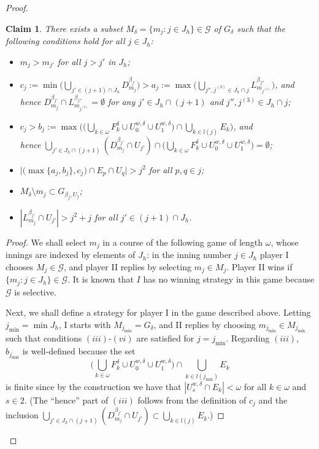 \documentclass[12pt,a4paper]{amsart}
\newtheorem{claim}[theorem]{Claim}
\theoremstyle{definition}
\newcommand{\w}{\omega}
\newcommand{\CG}{\mathcal{G}}
\begin{document}
\begin{proof}
\begin{claim} \label{cl01}
There exists a subset   $M_\delta =\{m_j: j\in J_h\}\in\CG$ of $G_\delta$ such that the following conditions hold for all $j\in J_h$:
\begin{itemize}
\item[$(i)$] $m_{j}>m_{j'}$ for all $j>j'$ in $J_h$;
\item[$(ii)$] 
$c_j:=\min\big(\bigcup_{j'\in(j+1)\cap J_h} D^{\beta_{j'}}_{m_j}  \big)> a_j:=
\max\big(\bigcup_{j'',j^{(3)}\in J_h\cap j} L^{\beta_{j''}}_{m_{j^{(3)}}}   \big)$,  and  \\ hence 
$D^{\beta_{j'}}_{m_j}\cap L^{\beta_{j''}}_{m_{j^{(3)}}}=\emptyset$
for any $j'\in J_h\cap (j+1)$ and $j'',j^{(3)}\in J_h\cap j$;
\item[$(iii)$] $c_j>b_j:=\max\Big(\big (\bigcup_{k\in \w}F^\delta_k\cup U^{w,\delta}_0\cup U^{w,\delta}_1\big)\cap\bigcup_{k\in l(j)}E_k\Big)$,
and \\ hence
$\bigcup_{j'\in J_h\cap (j+1)} (D^{\beta_{j'}}_{m_j}\cap U_{j'})\cap 
\big (\bigcup_{k\in \w}F^\delta_k\cup U^{w,\delta}_0\cup U^{w,\delta}_1\big)=\emptyset$;
\item[$(iv)$] 
$\Big|\big(\max\{a_j,b_j\},c_j\big)\cap E_{p}\cap U_{q}\Big|> j^2$ for all $p,q\in j$;
\item[$(v)$] $M_\delta\setminus m_j\subset G_{\beta_j,U_j} $;
\item[$(vi)$]  $|L^{\beta_{j'}}_{m_j}\cap U_{j'}|>j^2+j$
for all $j'\in (j+1)\cap J_h$.
\end{itemize}
\end{claim}
\begin{proof}
We shall select $m_j$ in a course of the following game of length $\w$,
whose innings are indexed by elements of $J_h$:
in the inning number $j\in J_h$ player I chooses $M_j\in \CG$, and player II replies by
selecting $m_j\in M_j$. Player II wins if $\{m_j:j\in J_h\}\in\CG$. It is known \cite[Theorem~2.6]{Laf96} that $I$ has no winning strategy in this game because 
$\CG$ is selective. 

Next, we shall define a strategy  for player I in the game described above.
Letting $j_{\min}=\min J_h$,
 I starts with 
$M_{j_{\min}}=G_\delta$, and II replies by choosing $m_{j_{\min}}\in M_{j_{\min}}$
such that conditions $(iii)$-$(vi)$ are satisfied for $j=j_{\min}$.
Regarding $(iii)$, $b_{j_{\min}}$ is well-defined because the set 
$$\big (\bigcup_{k\in \w}F^\delta_k\cup U^{w,\delta}_0\cup U^{w,\delta}_1\big)\cap\bigcup_{k\in l(j_{\min})}E_k$$
is finite since by the construction we 
have that $|U^{w,\delta}_s\cap E_k|<\w$ for all $k\in\w$ and $s\in 2$.
(The ``hence'' part of $(iii)$ follows from the definition of $c_j$ and
the inclusion $\bigcup_{j'\in J_h\cap (j+1)} (D^{\beta_{j'}}_{m_j}\cap U_{j'})\subset \bigcup_{k\in l(j)}E_k$.)



\end{proof}
\end{proof}
\end{document}
